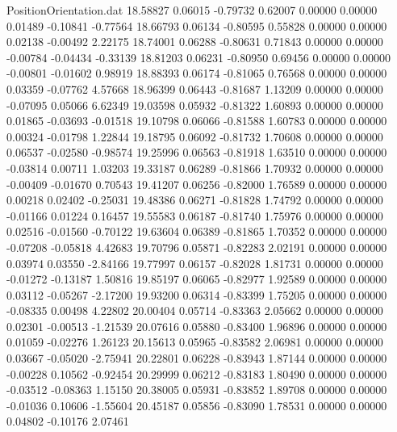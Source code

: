 \begin{filecontents}{PositionOrientation.dat}
  18.58827    0.06015   -0.79732     0.62007    0.00000    0.00000    0.01489   -0.10841   -0.77564
  18.66793    0.06134   -0.80595     0.55828    0.00000    0.00000    0.02138   -0.00492    2.22175
  18.74001    0.06288   -0.80631     0.71843    0.00000    0.00000   -0.00784   -0.04434   -0.33139
  18.81203    0.06231   -0.80950     0.69456    0.00000    0.00000   -0.00801   -0.01602    0.98919
  18.88393    0.06174   -0.81065     0.76568    0.00000    0.00000    0.03359   -0.07762    4.57668
  18.96399    0.06443   -0.81687     1.13209    0.00000    0.00000   -0.07095    0.05066    6.62349
  19.03598    0.05932   -0.81322     1.60893    0.00000    0.00000    0.01865   -0.03693   -0.01518
  19.10798    0.06066   -0.81588     1.60783    0.00000    0.00000    0.00324   -0.01798    1.22844
  19.18795    0.06092   -0.81732     1.70608    0.00000    0.00000    0.06537   -0.02580   -0.98574
  19.25996    0.06563   -0.81918     1.63510    0.00000    0.00000   -0.03814    0.00711    1.03203
  19.33187    0.06289   -0.81866     1.70932    0.00000    0.00000   -0.00409   -0.01670    0.70543
  19.41207    0.06256   -0.82000     1.76589    0.00000    0.00000    0.00218    0.02402   -0.25031
  19.48386    0.06271   -0.81828     1.74792    0.00000    0.00000   -0.01166    0.01224    0.16457
  19.55583    0.06187   -0.81740     1.75976    0.00000    0.00000    0.02516   -0.01560   -0.70122
  19.63604    0.06389   -0.81865     1.70352    0.00000    0.00000   -0.07208   -0.05818    4.42683
  19.70796    0.05871   -0.82283     2.02191    0.00000    0.00000    0.03974    0.03550   -2.84166
  19.77997    0.06157   -0.82028     1.81731    0.00000    0.00000   -0.01272   -0.13187    1.50816
  19.85197    0.06065   -0.82977     1.92589    0.00000    0.00000    0.03112   -0.05267   -2.17200
  19.93200    0.06314   -0.83399     1.75205    0.00000    0.00000   -0.08335    0.00498    4.22802
  20.00404    0.05714   -0.83363     2.05662    0.00000    0.00000    0.02301   -0.00513   -1.21539
  20.07616    0.05880   -0.83400     1.96896    0.00000    0.00000    0.01059   -0.02276    1.26123
  20.15613    0.05965   -0.83582     2.06981    0.00000    0.00000    0.03667   -0.05020   -2.75941
  20.22801    0.06228   -0.83943     1.87144    0.00000    0.00000   -0.00228    0.10562   -0.92454
  20.29999    0.06212   -0.83183     1.80490    0.00000    0.00000   -0.03512   -0.08363    1.15150
  20.38005    0.05931   -0.83852     1.89708    0.00000    0.00000   -0.01036    0.10606   -1.55604
  20.45187    0.05856   -0.83090     1.78531    0.00000    0.00000    0.04802   -0.10176    2.07461

\end{filecontents}
